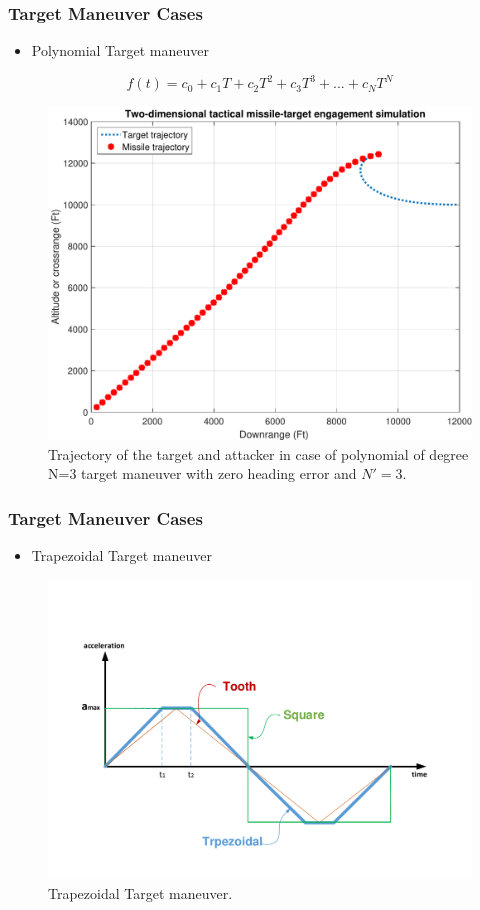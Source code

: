 \documentclass{beamer}
\begin{document}
\begin{frame}
\frametitle{Target Maneuver Cases}
\begin{itemize}
	\item Polynomial Target maneuver
\end{itemize}
\begin{equation}
f(t) = c_0 + c_1 T + c_2 T^2 + c_3 T^3 + ... + c_N T^N
\end{equation} 
\begin{figure}[H]
	\centering
	\includegraphics[scale = 0.2]{fig/trajectoryP3N3.pdf}
	\caption{Trajectory of the target and attacker in case of polynomial of degree N=3 target maneuver with zero heading error and $N'=3$.}
	\label{trajectoryP3}
\end{figure}
\end{frame}
\begin{frame}
\frametitle{Target Maneuver Cases}
\begin{itemize}
	\item Trapezoidal Target maneuver
\end{itemize}
\begin{figure}[htb]
	\centering
	\includegraphics[scale = 0.25]{fig/toothSquareTrapezoidal.pdf}
	\caption{Trapezoidal Target maneuver.}
	\label{trapezoidalacc}
\end{figure}
\end{frame}
\end{document}
